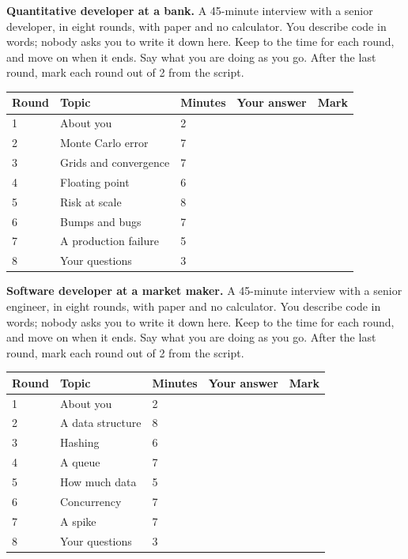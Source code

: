 \vfill\clearpage
\begin{question}\label{iq:iv2:mock-interviews:6}
\textbf{Quantitative developer at a bank.} A 45-minute interview with a senior developer, in eight rounds, with paper and no calculator. You describe code in words; nobody asks you to write it down here. Keep to the time for each round, and move on when it ends. Say what you are doing as you go. After the last round, mark each round out of 2 from the script.

\medskip
\begin{tabular}{@{}l|l|l|l|l@{}}
Round & Topic & Minutes & Your answer & Mark \\ \hline
1 & About you & 2 & & \\[6pt]\hline
2 & Monte Carlo error & 7 & & \\[6pt]\hline
3 & Grids and convergence & 7 & & \\[6pt]\hline
4 & Floating point & 6 & & \\[6pt]\hline
5 & Risk at scale & 8 & & \\[6pt]\hline
6 & Bumps and bugs & 7 & & \\[6pt]\hline
7 & A production failure & 5 & & \\[6pt]\hline
8 & Your questions & 3 & & \\[6pt]\hline
\end{tabular}
\end{question}

\vfill\clearpage
\begin{question}\label{iq:iv2:mock-interviews:7}
\textbf{Software developer at a market maker.} A 45-minute interview with a senior engineer, in eight rounds, with paper and no calculator. You describe code in words; nobody asks you to write it down here. Keep to the time for each round, and move on when it ends. Say what you are doing as you go. After the last round, mark each round out of 2 from the script.

\medskip
\begin{tabular}{@{}l|l|l|l|l@{}}
Round & Topic & Minutes & Your answer & Mark \\ \hline
1 & About you & 2 & & \\[6pt]\hline
2 & A data structure & 8 & & \\[6pt]\hline
3 & Hashing & 6 & & \\[6pt]\hline
4 & A queue & 7 & & \\[6pt]\hline
5 & How much data & 5 & & \\[6pt]\hline
6 & Concurrency & 7 & & \\[6pt]\hline
7 & A spike & 7 & & \\[6pt]\hline
8 & Your questions & 3 & & \\[6pt]\hline
\end{tabular}
\end{question}

